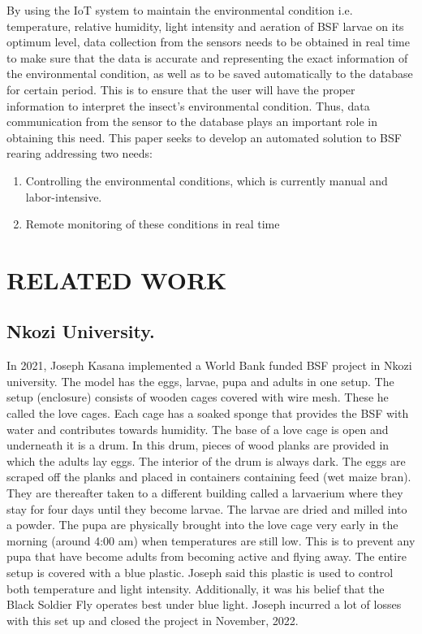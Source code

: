 \documentclass[conference]{IEEEtran}
\begin{document}
By using the IoT system to maintain the environmental condition i.e. temperature, relative
humidity, light intensity and aeration of BSF larvae on its optimum level, data collection from the
sensors needs to be obtained in real time to make sure that the data is accurate and representing
the exact information of the environmental condition, as well as to be saved automatically to the
database for certain period. This is to ensure that the user will have the proper information to
interpret the insect’s environmental condition. Thus, data communication from the sensor to the
database plays an important role in obtaining this need.
This paper seeks to develop an automated solution to BSF rearing addressing two needs:
\begin{enumerate}
    \item Controlling the environmental conditions, which is currently manual and labor-intensive.
    \item Remote monitoring of these conditions in real time
\end{enumerate}

\section{RELATED WORK}

\subsection{Nkozi University.}
In 2021, Joseph Kasana implemented a World Bank funded BSF project in Nkozi university. The
model has the eggs, larvae, pupa and adults in one setup. The setup (enclosure) consists of wooden
cages covered with wire mesh. These he called the love cages. Each cage has a soaked sponge that
provides the BSF with water and contributes towards humidity. The base of a love cage is open
and underneath it is a drum. In this drum, pieces of wood planks are provided in which the adults
lay eggs. The interior of the drum is always dark. The eggs are scraped off the planks and placed
in containers containing feed (wet maize bran). They are thereafter taken to a different building
called a larvaerium where they stay for four days until they become larvae. The larvae are dried
and milled into a powder. The pupa are physically brought into the love cage very early in the
morning (around 4:00 am) when temperatures are still low. This is to prevent any pupa that have
become adults from becoming active and flying away. The entire setup is covered with a blue
plastic. Joseph said this plastic is used to control both temperature and light intensity. Additionally,
it was his belief that the Black Soldier Fly operates best under blue light. Joseph incurred a lot of
losses with this set up and closed the project in November, 2022.
\end{document}
